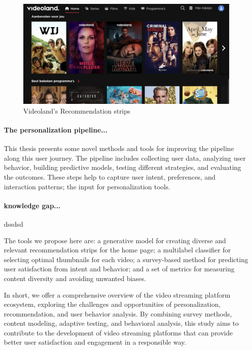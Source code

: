 \begin{figure}[h]
  \centering
  \includegraphics[width=\textwidth]{01-introduction/images/VLHome_cropped.png}
  \caption{Videoland's Recommendation strips}
  \label{fig:VLStrip}
\end{figure}

\paragraph{The personalization pipeline...}
This thesis presents some novel methods and tools for improving the pipeline along this user journey. The pipeline includes collecting user data, analyzing user behavior, building predictive models, testing different strategies, and evaluating the outcomes. These steps help to capture user intent, preferences, and interaction patterns; the input for personalization tools.

\paragraph{knowledge gap...} dssdsd

The tools we propose here are: a generative model for creating diverse and relevant recommendation strips for the home page; a multilabel classifier for selecting optimal thumbnails for each video; a survey-based method for predicting user satisfaction from intent and behavior; and a set of metrics for measuring content diversity and avoiding unwanted biases.

In short, we offer a comprehensive overview of the video streaming platform ecosystem, exploring the challenges and opportunities of personalization, recommendation, and user behavior analysis. By combining survey methods, content modeling, adaptive testing, and behavioral analysis, this study aims to contribute to the development of video streaming platforms that can provide better user satisfaction and engagement in a responsible way.









